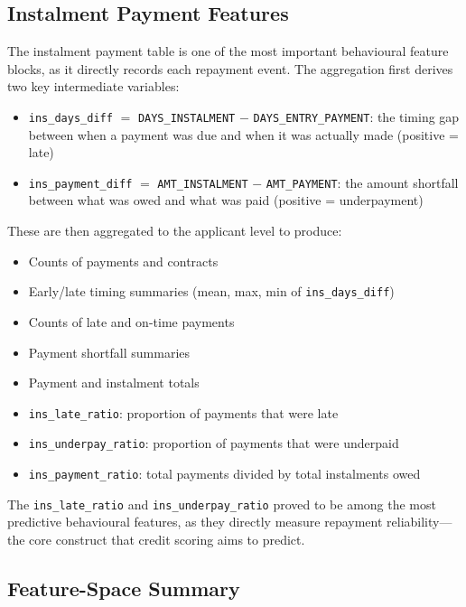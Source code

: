 \subsection{Instalment Payment Features}

The instalment payment table is one of the most important behavioural feature blocks, as it directly records each repayment event. The aggregation first derives two key intermediate variables:

\begin{itemize}
    \item \texttt{ins\_days\_diff} $=$ \texttt{DAYS\_INSTALMENT} $-$ \texttt{DAYS\_ENTRY\_PAYMENT}: the timing gap between when a payment was due and when it was actually made (positive = late)
    \item \texttt{ins\_payment\_diff} $=$ \texttt{AMT\_INSTALMENT} $-$ \texttt{AMT\_PAYMENT}: the amount shortfall between what was owed and what was paid (positive = underpayment)
\end{itemize}

These are then aggregated to the applicant level to produce:
\begin{itemize}
    \item Counts of payments and contracts
    \item Early/late timing summaries (mean, max, min of \texttt{ins\_days\_diff})
    \item Counts of late and on-time payments
    \item Payment shortfall summaries
    \item Payment and instalment totals
    \item \texttt{ins\_late\_ratio}: proportion of payments that were late
    \item \texttt{ins\_underpay\_ratio}: proportion of payments that were underpaid
    \item \texttt{ins\_payment\_ratio}: total payments divided by total instalments owed
\end{itemize}

The \texttt{ins\_late\_ratio} and \texttt{ins\_underpay\_ratio} proved to be among the most predictive behavioural features, as they directly measure repayment reliability---the core construct that credit scoring aims to predict.

\subsection{Feature-Space Summary}


